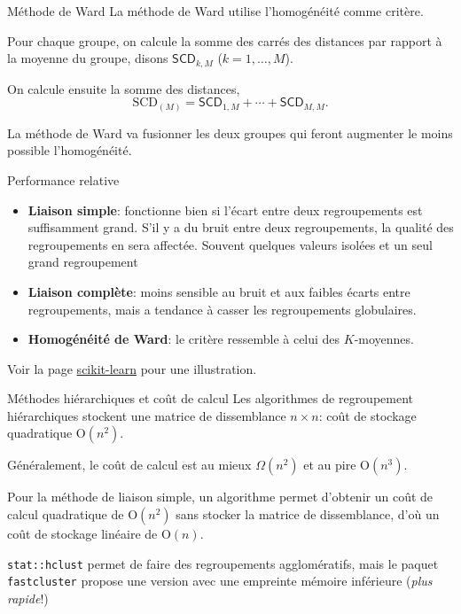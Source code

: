 \documentclass[
  ignorenonframetext,
]{beamer}
\begin{document}
\begin{frame}{Méthode de Ward}
\protect\hypertarget{muxe9thode-de-ward}{}
La méthode de Ward utilise l'homogénéité comme critère.

Pour chaque groupe, on calcule la somme des carrés des distances par
rapport à la moyenne du groupe, disons \(\mathsf{SCD}_{k,M}\)
(\(k=1, \ldots, M\)).

On calcule ensuite la somme des distances,
\[\mathrm{SCD}_{(M)} = \mathsf{SCD}_{1,M} + \cdots + \mathsf{SCD}_{M,M}.\]

La méthode de Ward va fusionner les deux groupes qui feront augmenter le
moins possible l'homogénéité.
\end{frame}

\begin{frame}{Performance relative}
\protect\hypertarget{performance-relative}{}
\begin{itemize}
\item
  \textbf{Liaison simple}: fonctionne bien si l'écart entre deux
  regroupements est suffisamment grand. S'il y a du bruit entre deux
  regroupements, la qualité des regroupements en sera affectée. Souvent
  quelques valeurs isolées et un seul grand regroupement
\item
  \textbf{Liaison complète}: moins sensible au bruit et aux faibles
  écarts entre regroupements, mais a tendance à casser les regroupements
  globulaires.
\item
  \textbf{Homogénéité de Ward}: le critère ressemble à celui des
  \(K\)-moyennes.
\end{itemize}

Voir la page
\href{https://scikit-learn.org/stable/auto_examples/cluster/plot_linkage_comparison.html}{scikit-learn}
pour une illustration.
\end{frame}

\begin{frame}[fragile]{Méthodes hiérarchiques et coût de calcul}
\protect\hypertarget{muxe9thodes-hiuxe9rarchiques-et-couxfbt-de-calcul}{}
Les algorithmes de regroupement hiérarchiques stockent une matrice de
dissemblance \(n \times n\): coût de stockage quadratique
\(\mathrm{O}(n^2)\).

Généralement, le coût de calcul est au mieux \(\Omega(n^2)\) et au pire
\(\mathrm{O}(n^3)\).

Pour la méthode de liaison simple, un algorithme permet d'obtenir un
coût de calcul quadratique de \(\mathrm{O}(n^2)\) sans stocker la
matrice de dissemblance, d'où un coût de stockage linéaire de
\(\mathrm{O}(n)\).

\texttt{stat::hclust} permet de faire des regroupements agglomératifs,
mais le paquet \texttt{fastcluster} propose une version avec une
empreinte mémoire inférieure (\emph{plus rapide}!)
\end{frame}
\end{document}
